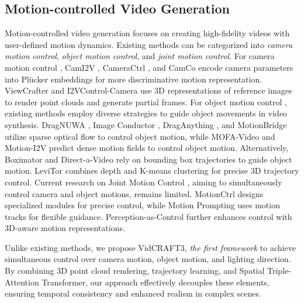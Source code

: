 \subsection{Motion-controlled Video Generation}
Motion-controlled video generation \cite{wang2024motionctrl,he2024cameractrl,yin2023dragnuwa} focuses on creating high-fidelity videos with user-defined motion dynamics.
Existing methods can be categorized into \textit{camera motion control}, \textit{object motion control}, and \textit{joint motion control}.
For camera motion control \cite{he2024cameractrl,bahmani2024vd3d,kuang2024collaborative,hou2024training,wang2024cpa}, CamI2V \cite{zheng2024cami2v}, CameraCtrl \cite{he2024cameractrl}, and CamCo \cite{xu2024camco} encode camera parameters into Plücker embeddings for more discriminative motion representation. 
ViewCrafter \cite{yu2024viewcrafter} and I2VControl-Camera \cite{feng2024i2vcontrolcamera} use 3D representations of reference images to render point clouds and generate partial frames.
For object motion control \cite{mou2024revideo,shi2024dragdiffusion,wang2023videocomposer,jain2024peekaboo,ma2024trailblazer,zhang2024tora,zhou2024trackgo,xu2024motion,pandey2024motion,he2024mojito,feng2024i2vcontrol,namekata2024sgi2v,xiao2025trajectory}, existing methods employ diverse strategies to guide object movements in video synthesis. DragNUWA \cite{yin2023dragnuwa}, Image Conductor \cite{li2024image}, DragAnything \cite{wu2025draganything}, and MotionBridge \cite{tanveer2024motionbridge} utilize sparse optical flow to control object motion, while MOFA-Video \cite{niu2025mofa} and Motion-I2V \cite{shi2024motion} predict dense motion fields to control object motion.  
Alternatively, Boximator \cite{wang2024boximator} and Direct-a-Video \cite{yang2024direct} rely on bounding box trajectories to guide object motion. 
LeviTor \cite{wang2024levitor} combines depth and K-means clustering for precise 3D trajectory control.
Current research on Joint Motion Control \cite{yang2024direct,wang2024motionctrl,geng2024motion,chen2025perception}, aiming to simultaneously control camera and object motions, remains limited. MotionCtrl \cite{wang2024motionctrl} designs specialized modules for precise control, while Motion Prompting \cite{geng2024motion} uses motion tracks for flexible guidance. Perception-as-Control \cite{chen2025perception} further enhances control with 3D-aware motion representations.

Unlike existing methods, we propose VidCRAFT3, \textit{the first framework} to achieve simultaneous control over camera motion, object motion, and lighting direction. By combining 3D point cloud rendering, trajectory learning, and Spatial Triple-Attention Transformer, our approach effectively decouples these elements, ensuring temporal consistency and enhanced realism in complex scenes.



